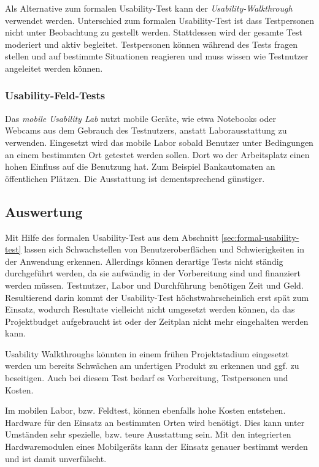 Als Alternative zum formalen Usability-Test kann der \textit{Usability-Walkthrough} verwendet werden. Unterschied zum formalen Usability-Test ist dass Testpersonen nicht unter Beobachtung zu gestellt werden. Stattdessen wird der gesamte Test moderiert und aktiv begleitet. Testpersonen können während des Tests fragen stellen und auf bestimmte Situationen reagieren und muss wissen wie Testnutzer angeleitet werden können.

\subsubsection{Usability-Feld-Tests}

Das \textit{mobile Usability Lab} nutzt mobile Geräte, wie etwa Notebooks oder Webcams aus dem Gebrauch des Testnutzers, anstatt Laborausstattung zu verwenden. Eingesetzt wird das mobile Labor sobald Benutzer unter Bedingungen an einem bestimmten Ort getestet werden sollen. Dort wo der Arbeitsplatz einen hohen Einfluss auf die Benutzung hat. Zum Beispiel Bankautomaten an öffentlichen Plätzen. Die Ausstattung ist dementsprechend günstiger. 

\cite{usabilityblog_wasBeachten}

\cite{usabilityblog_eResult}

\subsection{Auswertung}

Mit Hilfe des formalen Usability-Test aus dem Abschnitt \ref{sec:formal-usability-test} lassen sich Schwachstellen von Benutzeroberflächen und Schwierigkeiten in der Anwendung erkennen. Allerdings können derartige Tests nicht ständig durchgeführt werden, da sie aufwändig in der Vorbereitung sind und finanziert werden müssen. Testnutzer, Labor und Durchführung benötigen Zeit und Geld. Resultierend darin kommt der Usability-Test höchstwahrscheinlich erst spät zum Einsatz, wodurch Resultate vielleicht nicht umgesetzt werden können, da das Projektbudget aufgebraucht ist oder der Zeitplan nicht mehr eingehalten werden kann. 

Usability Walkthroughs könnten in einem frühen Projektstadium eingesetzt werden um bereits Schwächen am unfertigen Produkt zu erkennen und ggf. zu beseitigen. Auch bei diesem Test bedarf es Vorbereitung, Testpersonen und Kosten.

Im mobilen Labor, bzw. Feldtest, können ebenfalls hohe Kosten entstehen. Hardware für den Einsatz an bestimmten Orten wird benötigt. Dies kann unter Umständen sehr spezielle, bzw. teure Ausstattung sein. Mit den integrierten Hardwaremodulen eines Mobilgeräts kann der Einsatz genauer bestimmt werden und ist damit unverfälscht.

